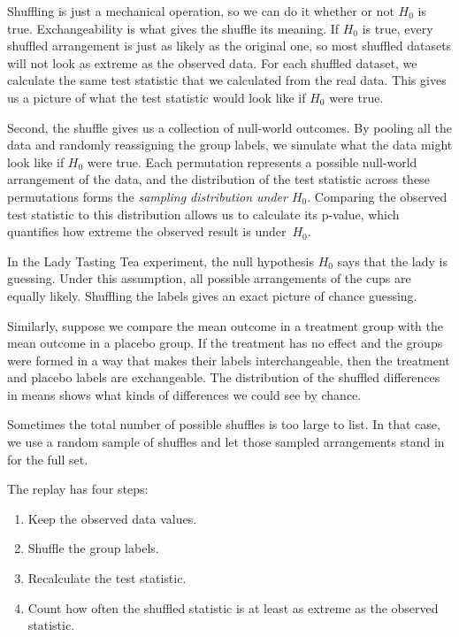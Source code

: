 Shuffling is just a mechanical operation, so we can do it whether or
not $H_0$ is true. Exchangeability is what gives the shuffle its
meaning. If $H_0$ is true, every shuffled arrangement is just as likely
as the original one, so most shuffled datasets will not look as
extreme as the observed data. For each shuffled dataset, we calculate
the same test statistic that we calculated from the real data. This
gives us a picture of what the test statistic would look like if
$H_0$ were true.


Second, the shuffle gives us a collection of null-world outcomes. By
pooling all the data and randomly reassigning the group labels, we
simulate what the data might look like if $H_0$ were true. Each
permutation represents a possible null-world arrangement of the data,
and the distribution of the test statistic across these permutations
forms the \emph{sampling distribution under
  $H_0$}. Comparing the
observed test statistic to this distribution allows us to calculate
its p-value, which quantifies how extreme the observed result is
under~$H_0$.


In the Lady Tasting Tea experiment, the null hypothesis
$H_0$ says that the lady is guessing. Under this assumption, all
possible arrangements of the cups are equally likely. Shuffling the
labels gives an exact picture of chance guessing.

Similarly, suppose we compare the mean outcome in a treatment group
with the mean outcome in a placebo group. If the treatment has no
effect and the groups were formed in a way that makes their labels
interchangeable, then the treatment and placebo labels are
exchangeable. The distribution of the shuffled differences in means
shows what kinds of differences we could see by chance.


Sometimes the total number of possible shuffles is too large to list.
In that case, we use a random sample of shuffles and let those sampled
arrangements stand in for the full set.

The replay has four steps:
\begin{enumerate}
\item Keep the observed data values.
\item Shuffle the group labels.
\item Recalculate the test statistic.
\item Count how often the shuffled statistic is at least as extreme as
      the observed statistic.
\end{enumerate}


